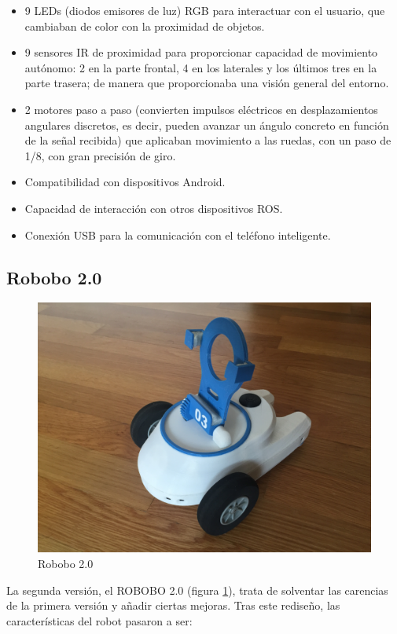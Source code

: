 \begin{itemize}

	\item 9 LEDs (diodos emisores de luz) RGB para interactuar con el usuario, que cambiaban de color con la proximidad de objetos.
	\item 9 sensores IR de proximidad para proporcionar capacidad de movimiento autónomo: 2 en la parte frontal, 4 en los laterales y los últimos tres en la parte trasera; de manera que proporcionaba una visión general del entorno.
	\item 2 motores paso a paso (convierten impulsos eléctricos en desplazamientos angulares discretos, es decir, pueden avanzar un ángulo concreto en función de la señal recibida) que aplicaban movimiento a las ruedas, con un paso de 1/8, con gran precisión de giro.
	\item Compatibilidad con dispositivos Android.
	\item Capacidad de interacción con otros dispositivos ROS.
	\item Conexión USB para la comunicación con el teléfono inteligente.

\end{itemize}

\subsection{Robobo 2.0}
\begin{figure}
	\centering
	\includegraphics[width=0.8\linewidth]{imagenes/robobo_rob.JPG}
	\caption{Robobo 2.0}
	\label{fig:robobo_2_0}
\end{figure} 

La segunda versión, el ROBOBO 2.0 (figura \ref{fig:robobo_2_0}), trata de solventar las carencias de la primera versión y añadir ciertas mejoras. Tras este rediseño, las características del robot pasaron a ser:

